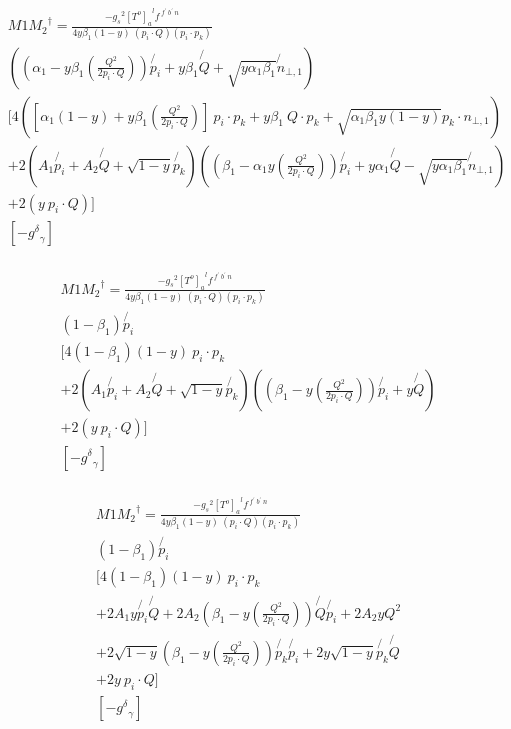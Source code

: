 \begin{equation}
\begin{split}
&M1{M_2}^{\dagger}=\frac{-{g_s}^2 {[T^{o}]_a}^{l} f^{\:f^{\prime}\: b^{\prime}\:n}}{4y\beta_1 (1-y)\:(p_i \cdot Q)(p_i \cdot p_k)}\\
&((\alpha_1 -y\beta_1(\frac{Q^2}{2p_i \cdot Q})) \not{p_i} + y\beta_1\not{Q} + \sqrt{y\alpha_1\beta_1}\not{n}_{\bot,1} )\\
&[4([\alpha_1 (1-y)+y\beta_1(\frac{Q^2}{2p_i \cdot Q})]\:p_i \cdot p_k+y\beta_1\:Q\cdot p_k+\sqrt{\alpha_1\beta_1y(1-y)} p_k \cdot {n_{\bot,1}})\\
&+2(A_1\not{p_i} + A_2\not{Q} + \sqrt{1-y}\not{p_k})((\beta_1 -\alpha_1 y(\frac{Q^2}{2p_i \cdot Q}))\not{p_i} + y\alpha_1\not{Q} - \sqrt{y\alpha_1\beta_1}\not{n}_{\bot,1})\\
&+2(y\:p_i\cdot Q)]\\
&[-{g^{\delta}}_{\gamma}]\\
\end{split}
\end{equation}

\begin{equation}
\begin{split}
&M1{M_2}^{\dagger}=\frac{-{g_s}^2 {[T^{o}]_a}^{l} f^{\:f^{\prime}\: b^{\prime}\:n}}{4y\beta_1 (1-y)\:(p_i \cdot Q)(p_i \cdot p_k)}\\
&(1-\beta_1) \not{p_i} \\
&[4(1-\beta_1) (1-y)\:p_i \cdot p_k\\
&+2(A_1\not{p_i} + A_2\not{Q} + \sqrt{1-y}\not{p_k})((\beta_1 - y(\frac{Q^2}{2p_i \cdot Q}))\not{p_i} + y\not{Q} )\\
&+2(y\:p_i\cdot Q)]\\
&[-{g^{\delta}}_{\gamma}]\\
\end{split}
\end{equation}

\begin{equation}
\begin{split}
&M1{M_2}^{\dagger}=\frac{-{g_s}^2 {[T^{o}]_a}^{l} f^{\:f^{\prime}\: b^{\prime}\:n}}{4y\beta_1 (1-y)\:(p_i \cdot Q)(p_i \cdot p_k)}\\
&(1-\beta_1) \not{p_i} \\
&[4(1-\beta_1) (1-y)\:p_i \cdot p_k\\
&+2A_1y\not{p_i}\not{Q} + 2A_2(\beta_1 - y(\frac{Q^2}{2p_i \cdot Q}))\not{Q}\not{p_i}+2A_2yQ^2\\
& + 2\sqrt{1-y}(\beta_1 - y(\frac{Q^2}{2p_i \cdot Q}))\not{p_k}\not{p_i}+ 2y\sqrt{1-y}\not{p_k}\not{Q}\\
&+2y\:p_i\cdot Q]\\
&[-{g^{\delta}}_{\gamma}]\\
\end{split}
\end{equation}

